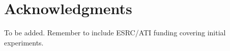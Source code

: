 \documentclass{josis}
\begin{document}







\section*{Acknowledgments}

To be added. Remember to include ESRC/ATI funding covering initial experiments.



\end{document}
